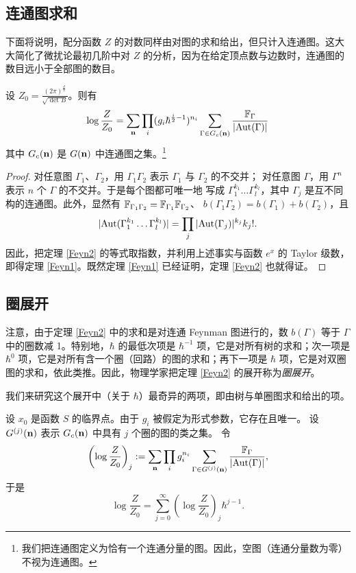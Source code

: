 \subsection{连通图求和}
下面将说明，配分函数 $Z$ 的对数同样由对图的求和给出，但只计入连通图。这大大简化了微扰论最初几阶中对 $Z$ 的分析，因为在给定顶点数与边数时，连通图的数目远小于全部图的数目。
\begin{theorem}\label{Feyn2} 设 $Z_0=\frac{(2\pi)^{\frac{d}{2}}}{\sqrt{\det B}}$。则有
$$
\log\frac{Z}{Z_0}=\sum_{\bold n}
\prod_i(g_i\hbar^{\frac{i}{2}-1})^{n_i}
\sum_{\Gamma\in G_c(\bold n)}\frac{\Bbb F_\Gamma}{|{\rm Aut}(\Gamma)|}
$$
其中 $G_c(\bold n)$ 是 $G(\bold n)$ 中连通图之集。\footnote{我们把连通图定义为恰有一个连通分量的图。因此，空图（连通分量数为零）不视为连通图。}
\end{theorem}

\begin{proof}
  对任意图 $\Gamma_1$、$\Gamma_2$，用 $\Gamma_1\Gamma_2$ 表示 $\Gamma_1$ 与 $\Gamma_2$ 的不交并；
  对任意图 $\Gamma$，用 $\Gamma^n$ 表示 $n$ 个 $\Gamma$ 的不交并。于是每个图都可唯一地
  写成 $\Gamma_1^{k_1} \ldots \Gamma_l^{k_l}$，其中 $\Gamma_j$
  是互不同构的连通图。此外，显然有
  $\Bbb F_{\Gamma_1\Gamma_2}=\Bbb F_{\Gamma_1}\Bbb F_{\Gamma_2}$、
  $b(\Gamma_1\Gamma_2)=b(\Gamma_1)+b(\Gamma_2)$，且
  $$
  |{\rm
    Aut}(\Gamma_1^{k_1} \ldots \Gamma_l^{k_l})|= \prod_j|{\rm
    Aut}(\Gamma_j)|^{k_j}k_j!.
    $$
    因此，把定理 \ref{Feyn2} 的等式取指数，并利用上述事实与函数 $e^x$ 的 Taylor 级数，
  即得定理 \ref{Feyn1}。既然定理 \ref{Feyn1} 已经证明，定理 \ref{Feyn2} 也就得证。
\end{proof}

\subsection{圈展开}
注意，由于定理 \ref{Feyn2} 中的求和是对连通 Feynman 图进行的，数 $b(\Gamma)$ 等于 $\Gamma$ 中的圈数减 1。特别地，$\hbar$ 的最低次项是 $\hbar^{-1}$ 项，它是对所有树的求和；次一项是 $\hbar^0$ 项，它是对所有含一个圈（回路）的图的求和；再下一项是 $\hbar$ 项，它是对双圈图的求和，依此类推。因此，物理学家把定理 \ref{Feyn2} 的展开称为\emph{圈展开}。

我们来研究这个展开中（关于 $\hbar$）最奇异的两项，即由树与单圈图求和给出的项。

设 $x_0$ 是函数 $S$ 的临界点。由于 $g_i$ 被假定为形式参数，它存在且唯一。
设 $G^{(j)}(\bold n)$ 表示 $G_c(\bold n)$ 中具有 $j$ 个圈的图的类之集。
令
$$
\left(\log\frac{Z}{Z_0}\right)_j:=
\sum_{\bold n}\prod_ig_i^{n_i}
\sum_{\Gamma\in G^{(j)}(\bold n)}\frac{\Bbb F_\Gamma}{|{\rm Aut}(\Gamma)|},
$$
于是
$$
\log\frac{Z}{Z_0}=\sum_{j=0}^\infty \left(\log\frac{Z}{Z_0}\right)_j \hbar^{j-1}.
$$

